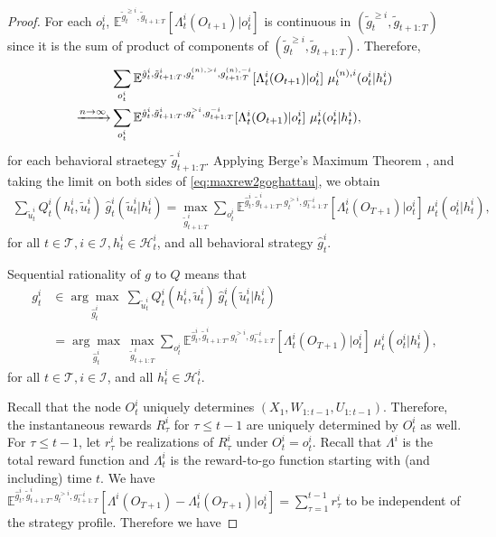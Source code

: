 \documentclass[pdflatex,sn-basic]{sn-jnl}
\newcommand{\E}{\mathbb{E}}
\newcommand{\Qfunc}{Q}
\theoremstyle{thmstyleone}%
\theoremstyle{thmstyletwo}%
\theoremstyle{thmstylethree}%
\begin{document}
\begin{appendices}
\begin{proof}
		For each $o_t^i$, $\E^{\tilde{g}_{t}^{\geq i}, \tilde{g}_{t+1:T}}[\Lambda_t^i(O_{t+1})|o_t^i]$ is continuous in $(\tilde{g}_{t}^{\geq i}, \tilde{g}_{t+1:T})$ since it is the sum of product of components of $(\tilde{g}_{t}^{\geq i}, \tilde{g}_{t+1:T})$. Therefore, 
		\begin{align}
			&\sum_{o_t^i}\E^{\hat{g}_t^i, \tilde{g}_{t+1:T}^i, g_{t}^{(n), >i}, g_{t+1:T}^{(n), -i}}[\Lambda_t^i(O_{t+1})|o_t^i]\ \mu_t^{(n), i}(o_t^i|h_t^i)\notag\\
			\xrightarrow{n\rightarrow\infty}& \sum_{o_t^i}\E^{\hat{g}_t^i, \tilde{g}_{t+1:T}^i, g_{t}^{>i}, g_{t+1:T}^{ -i}}[\Lambda_t^i(O_{t+1})|o_t^i]\ \mu_t^{i}(o_t^i|h_t^i),
		\end{align}
		for each behavioral straetegy $\tilde{g}_{t+1:T}^i$. Applying Berge's Maximum Theorem \citep{sundaram1996first}, and taking the limit on both sides of \eqref{eq:maxrew2goghattau}, we obtain
		\begin{align}
			\sum_{\tilde{u}_t^i} \Qfunc_t^{i}(h_t^i, \tilde{u}_t^i)~ \hat{g}_{t}^i(\tilde{u}_t^i|h_{t}^i)=
			\max_{\tilde{g}_{t+1:T}^i} \sum_{o_t^i} \E^{\hat{g}_t^i, \tilde{g}_{t+1:T}^i, g_{t}^{>i}, g_{t+1:T}^{-i}}[\Lambda_t^i(O_{T+1})|o_t^i]~\mu_t^{i}(o_t^i|h_t^i),\label{eq:B50}
		\end{align}
		for all $t\in\mathcal{T}, i\in\mathcal{I}, h_t^i\in\mathcal{H}_t^i$, and all behavioral strategy $\hat{g}_{t}^i$.
		
		Sequential rationality of $g$ to $\Qfunc$ means that
		\begin{equation}
		\begin{split}
			g_{t}^i &\in \underset{\hat{g}_t^i}{\arg\max }~\sum_{\tilde{u}_t^i} \Qfunc_t^{i}(h_t^i, \tilde{u}_t^i) ~\hat{g}_{t}^i(\tilde{u}_t^i|h_{t}^i)\\
			&=\underset{\hat{g}_t^i}{\arg\max }~\max_{\tilde{g}_{t+1:T}^i} \sum_{o_t^i} \E^{\hat{g}_t^i, \tilde{g}_{t+1:T}^i, g_{t}^{>i}, g_{t+1:T}^{-i}}[\Lambda_t^i(O_{T+1})|o_t^i]~\mu_t^{i}(o_t^i|h_t^i),
		\end{split}
		\end{equation}
		for all $t\in\mathcal{T}, i\in\mathcal{I}$, and all $h_t^i\in\mathcal{H}_t^i$.
		
		  {Recall that the node $O_t^i$ uniquely determines $(X_1, W_{1:t-1}, U_{1:t-1})$. Therefore, the instantaneous rewards $R_\tau^i$ for $\tau \leq t-1$ are uniquely determined by $O_t^i$ as well. For $\tau \leq t-1$, let $r_\tau^i$ be realizations of $R_\tau^i$ under $O_t^i=o_t^i$. Recall that $\Lambda^i$ is the total reward function and $\Lambda_t^i$ is the reward-to-go function starting with (and including) time $t$.} We have $\E^{\hat{g}_t^i, \tilde{g}_{t+1:T}^i, g_{t}^{>i}, g_{t+1:T}^{-i}}[\Lambda^i(O_{T+1}) - \Lambda_t^i(O_{T+1})|o_t^i] = \sum_{\tau=1}^{t-1} r_\tau^i$ to be independent of the strategy profile. Therefore we have 
		

\end{proof}
\end{appendices}
\end{document}
